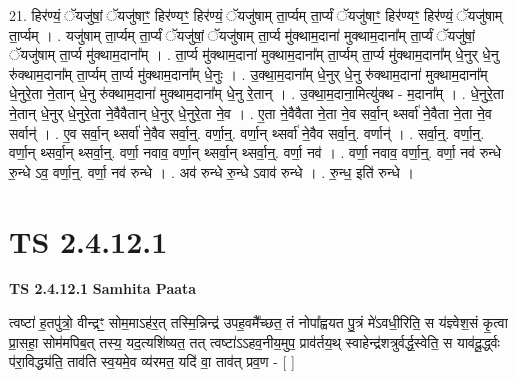 \documentclass[17pt]{extarticle}
\begin{document}
21. हिर॑ण्यं॒ ॅयजु॑षां॒ ॅयजु॑षाꣳ॒॒ हिर॑ण्यꣳ॒॒ हिर॑ण्यं॒ ॅयजु॑षाम् ता॒र्प्यम् ता॒र्प्यं ॅयजु॑षाꣳ॒॒ हिर॑ण्यꣳ॒॒ हिर॑ण्यं॒ ॅयजु॑षाम् ता॒र्प्यम् । . यजु॑षाम् ता॒र्प्यम् ता॒र्प्यं ॅयजु॑षां॒ ॅयजु॑षाम् ता॒र्प्य मु॑क्थाम॒दाना॑ मुक्थाम॒दाना᳚म् ता॒र्प्यं ॅयजु॑षां॒ ॅयजु॑षाम् ता॒र्प्य मु॑क्थाम॒दाना᳚म् । . ता॒र्प्य मु॑क्थाम॒दाना॑ मुक्थाम॒दाना᳚म् ता॒र्प्यम् ता॒र्प्य मु॑क्थाम॒दाना᳚म् धे॒नुर् धे॒नु रु॑क्थाम॒दाना᳚म् ता॒र्प्यम् ता॒र्प्य मु॑क्थाम॒दाना᳚म् धे॒नुः । . उ॒क्था॒म॒दाना᳚म् धे॒नुर् धे॒नु रु॑क्थाम॒दाना॑ मुक्थाम॒दाना᳚म् धे॒नुरे॒ता ने॒तान् धे॒नु रु॑क्थाम॒दाना॑ मुक्थाम॒दाना᳚म् धे॒नु रे॒तान् । . उ॒क्था॒म॒दाना॒मित्यु॑क्थ - म॒दाना᳚म् । . धे॒नुरे॒ता ने॒तान् धे॒नुर् धे॒नुरे॒ता ने॒वैवैतान् धे॒नुर् धे॒नुरे॒ता ने॒व । . ए॒ता ने॒वैवैता ने॒ता ने॒व सर्वा॒न् थ्सर्वा॑ ने॒वैता ने॒ता ने॒व सर्वान्॑ । . ए॒व सर्वा॒न् थ्सर्वा॑ ने॒वैव सर्वा॒न्॒. वर्णा॒न्॒. वर्णा॒न् थ्सर्वा॑ ने॒वैव सर्वा॒न्॒. वर्णान्॑ । . सर्वा॒न्॒. वर्णा॒न्॒. वर्णा॒न् थ्सर्वा॒न् थ्सर्वा॒न्॒. वर्णा॒ नवाव॒ वर्णा॒न् थ्सर्वा॒न् थ्सर्वा॒न्॒. वर्णा॒ नव॑ । . वर्णा॒ नवाव॒ वर्णा॒न्॒. वर्णा॒ नव॑ रुन्धे रु॒न्धे ऽव॒ वर्णा॒न्॒. वर्णा॒ नव॑ रुन्धे । . अव॑ रुन्धे रु॒न्धे ऽवाव॑ रुन्धे । . रु॒न्ध॒ इति॑ रुन्धे । \newline
\pagebreak
{}
\section*{ TS 2.4.12.1 }

\textbf{TS 2.4.12.1 } \newline
\textbf{Samhita Paata} \newline

त्वष्टा॑ ह॒तपु॑त्रो॒ वीन्द्रꣳ॒॒ सोम॒माऽह॑र॒त् तस्मि॒न्निन्द्र॑ उपह॒वमै᳚च्छत॒ तं नोपा᳚ह्वयत पु॒त्रं मे॑ऽवधी॒रिति॒ स य॑ज्ञ्वेश॒सं कृ॒त्वा प्रा॒सहा॒ सोम॑मपिब॒त् तस्य॒ यद॒त्यशि॑ष्यत॒ तत् त्वष्टा॑ऽऽहव॒नीय॒मुप॒ प्राव॑र्तय॒थ् स्वाहेन्द्र॑शत्रुर्वर्द्ध॒स्वेति॒ स याव॑दू॒र्द्ध्वः प॑रा॒विद्ध्य॑ति॒ ताव॑ति स्व॒यमे॒व व्य॑रमत॒ यदि॑ वा॒ ताव॑त् प्रव॒ण - [  ] \newline
\end{document}
